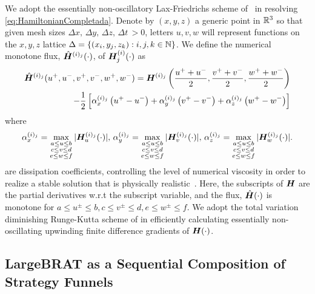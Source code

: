 We adopt the essentially non-oscillatory Lax-Friedrichs scheme of~\cite{OsherShuENO, Crandall1984Approx} in resolving \eqref{eq:HamiltonianCompletada}. Denote by $(x, y, z)$ a generic point in $\mathbb{R}^3$ so that given mesh sizes $\Delta x, \, \Delta y, \, \Delta z, \, \Delta t \, > 0$, letters $u,v,w$ will represent functions on the $x,y,z$ lattice $\Delta=\{(x_i,y_j, z_k): i, j, k \in \mathbb{N}\}$. We define the numerical monotone flux, 	$\hat{\bm{H}}^{(i)_j}(\cdot)$, of $\bm{H}_j^{(i)}(\cdot)$ as 
%
\begin{align}
	\hat{\bm{H}}^{(i)_j}(u^+, u^-, v^+, v^-, w^+, w^-) = \bm{H}^{(i)_j}\left(\frac{u^+ +u^-}{2}, \frac{v^+ +v^-}{2}, \frac{w^+ +w^-}{2}\right) \nonumber
	\\
	- \dfrac{1}{2}\left[ \alpha_x^{(i)_j} \left(u^+ - u^-\right) + \alpha_y^{(i)_j}\left(v^+ - v^-\right) + \alpha_z^{(i)_j}\left(w^+ - w^-\right)\right]
\end{align}
%
where
%
\begin{align}
	\alpha_x^{(i)_j} = \max_{\substack{ a \le u \le b \\ c \le v \le d  \\ e \le w \le f}} |\hamfunc_{u}^{(i)_j}(\cdot)|, %
	\, \alpha_y^{(i)_j} = \max_{\substack{ a \le u \le b \\ c \le v \le d  \\ e \le w \le f}} |\hamfunc_{v}^{(i)_j}(\cdot)|, %
	\, \alpha_z^{(i)_j} = \max_{\substack{ a \le u \le b \\ c \le v \le d  \\ e \le w \le f}} |\hamfunc_{w}^{(i)_j}(\cdot)|. %
\end{align}
%
are dissipation coefficients, controlling the level of numerical viscosity in order to realize a stable solution that is physically realistic~\cite{Crandall1984Approx}. Here, the subscripts of $\bm{H}$ are the partial derivatives w.r.t the subscript variable, and the flux, $\hat{\bm{H}}(\cdot)$ is monotone for $a \le u^\pm \le b, c \le v^\pm \le d, e \le w^\pm \le f$. We adopt the total variation diminishing Runge-Kutta scheme of \cite{Osher1987} in efficiently calculating essentially non-oscillating upwinding finite difference gradients of $\bm{H}(\cdot)$.

\subsection{LargeBRAT as a Sequential Composition of Strategy Funnels}
% 
\label{sucsec:murmur_funnels}

